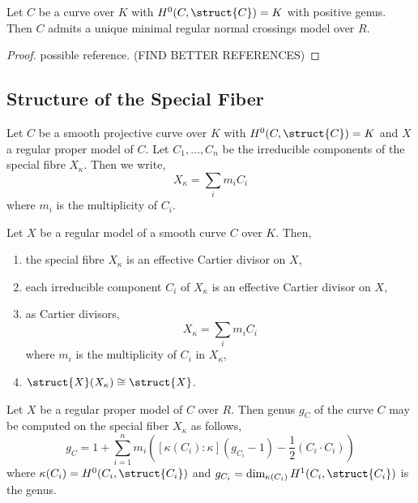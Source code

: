 \begin{theorem}
Let $C$ be a curve over $K$ with $H^0(C, \struct{C}) = K$ with positive genus. Then $C$ admits a unique minimal regular normal crossings model over $R$.
\end{theorem}

\begin{proof}
\cite{romagny_models} possible reference. (FIND BETTER REFERENCES)
\end{proof}

\subsection{Structure of the Special Fiber}

\begin{definition}
Let $C$ be a smooth projective curve over $K$ with $H^0(C, \struct{C}) = K$ and $X$ a regular proper model of $C$. Let $C_1, \dots, C_n$ be the irreducible components of the special fibre $X_\kappa$. Then we write,
\[ X_\kappa = \sum_i m_i C_i \]
where $m_i$ is the multiplicity of $C_i$. 
\end{definition}

\begin{lemma}[Tag 01WS]
Let $X$ be a regular model of a smooth curve $C$ over $K$. Then,
\begin{enumerate}
\item the special fibre $X_\kappa$ is an effective Cartier divisor on $X$,
\item each irreducible component $C_i$ of $X_\kappa$ is an effective Cartier divisor on $X$,
\item as Cartier divisors,
\[ X_\kappa = \sum_i m_i C_i \]
where $m_i$ is the multiplicity of $C_i$ in $X_\kappa$,
\item $\struct{X}(X_\kappa) \cong \struct{X}$. 
\end{enumerate}
\end{lemma}

\begin{prop}
Let $X$ be a regular proper model of $C$ over $R$. Then genus $g_C$ of the curve $C$ may be computed on the special fiber $X_\kappa$ as follows,
\[ g_C = 1 + \sum_{i = 1}^n m_i \left( [\kappa(C_i) : \kappa] (g_{C_i} - 1) - \frac{1}{2} (C_i \cdot C_i) \right) \]
where $\kappa(C_i) = H^0(C_i, \struct{C_i})$ and $g_{C_i} = \dim_{\kappa(C_i)} H^1(C_i, \struct{C_i})$ is the genus.
\end{prop}
